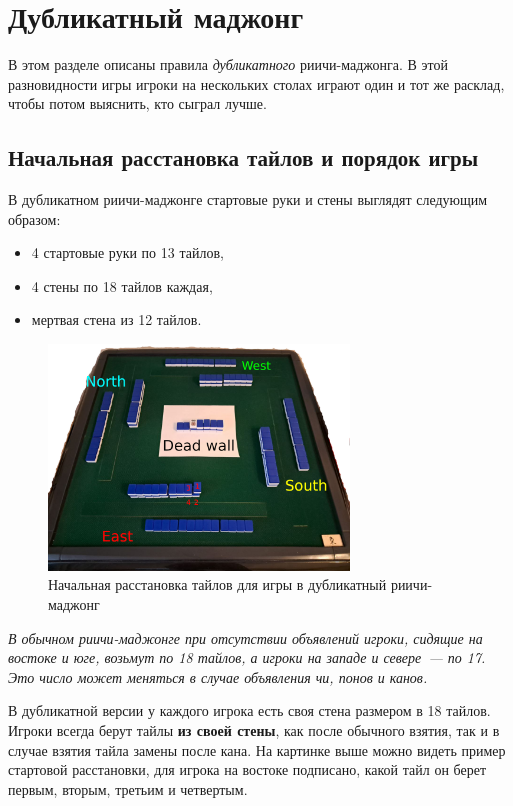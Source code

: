 \section{Дубликатный маджонг}

\begin{additional}

В этом разделе описаны правила \textit{дубликатного} риичи-маджонга. В этой разновидности игры игроки на нескольких столах играют один и тот же расклад, чтобы потом выяснить, кто сыграл лучше.

\subsection{Начальная расстановка тайлов и порядок игры}

В дубликатном риичи-маджонге стартовые руки и стены выглядят следующим образом:

\begin{itemize}
	\item 4 стартовые руки по 13 тайлов,
	\item 4 стены по 18 тайлов каждая,
	\item мертвая стена из 12 тайлов.
\end{itemize}

\begin{figure}[H]
	\centering
	\includegraphics[width=8cm]{img/duplicate_start.png}
	\caption{Начальная расстановка тайлов для игры в дубликатный риичи-маджонг}
\end{figure}

\textit{В обычном риичи-маджонге при отсутствии объявлений игроки, сидящие на востоке и юге, возьмут по 18 тайлов, а игроки на западе и севере~--- по 17. Это число может меняться в случае объявления чи, понов и канов.}

В дубликатной версии у каждого игрока есть своя стена размером в 18 тайлов. Игроки всегда берут тайлы \textbf{из своей стены}, как после обычного взятия, так и в случае взятия тайла замены после кана. На картинке выше можно видеть пример стартовой расстановки, для игрока на востоке подписано, какой тайл он берет первым, вторым, третьим и четвертым.


\end{additional}
